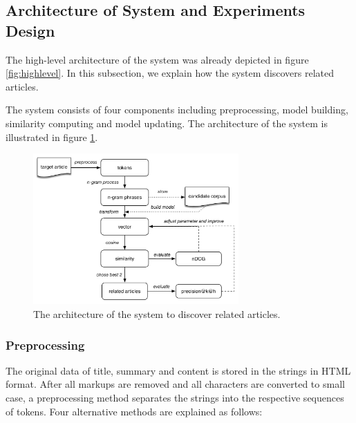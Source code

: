 \begin{description}
\label{tab:def_terms}
\end{description}


\subsection{Architecture of System and Experiments Design}
\label{sec:4.3}

The high-level architecture of the system was already depicted in figure \ref{fig:highlevel}. In this subsection, we explain how the system discovers related articles. 

The system consists of four components including preprocessing, model building, similarity computing and model updating. The architecture of the system is illustrated in figure \ref{fig:unsupervised}. 

\begin{figure}[!htb]
    \centering
    \includegraphics[width=0.7\textwidth]{fig/unsupervise}
    \caption{The architecture of the system to discover related articles.}
    \label{fig:unsupervised}
\end{figure}

\subsubsection{Preprocessing}
The original data of title, summary and content is stored in the strings in HTML format. After all markups are removed and all characters are converted to small case, a preprocessing method separates the strings into the respective sequences of tokens. Four alternative methods are explained as follows:

